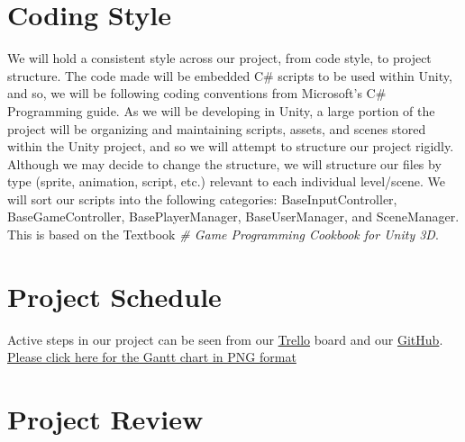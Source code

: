 \documentclass{article}
\begin{document}
\section{Coding Style}
We will hold a consistent style across our project, from code style, to project structure. The code made will be embedded C# scripts to be used within Unity, and so, we will be following coding conventions from Microsoft's C# Programming guide. As we will be developing in Unity, a large portion of the project will be organizing and maintaining scripts, assets, and scenes stored within the Unity project, and so we will attempt to structure our project rigidly. Although we may decide to change the structure, we will structure our files by type (sprite, animation, script, etc.) relevant to each individual level/scene. We will sort our scripts into the following categories: BaseInputController, BaseGameController, BasePlayerManager, BaseUserManager, and SceneManager. This is based on the Textbook \textit{# Game Programming Cookbook for Unity 3D}.

\section{Project Schedule}
Active steps in our project can be seen from our \href{https://trello.com/b/EhBOjUN5/weekly-stand-up}{Trello} board and our \href{https://github.com/Evan-HR/Handits}{GitHub}.
\\
\href{https://github.com/Evan-HR/Handits/blob/master/Handits%20Gantt.png?raw=true}{Please click here for the Gantt chart in PNG format}

\section{Project Review}
\end{document}
